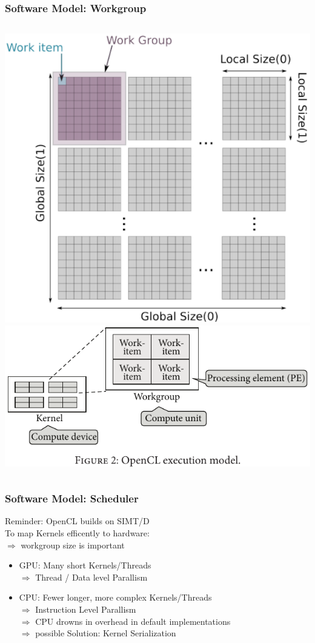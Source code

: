\documentclass{beamer}
\begin{document}
\begin{frame}
    \frametitle{Software Model: Workgroup}
    \begin{columns}
            \includegraphics[width=\textwidth]{res/2DDataParallelWorkgroup.png}  
            \includegraphics[width=\textwidth]{res/ExecutionModel.png}   
    \end{columns}
\end{frame}
\begin{frame}
    \frametitle{Software Model: Scheduler}
    Reminder: OpenCL builds on SIMT/D\\
    To map Kernels efficently to hardware:\\
    $\Rightarrow$ workgroup size is important
    \begin{itemize}
        \item GPU: Many short Kernels/Threads\\
             $\Rightarrow$ Thread / Data level Parallism
        \item CPU: Fewer longer, more complex Kernels/Threads\\
             $\Rightarrow$ Instruction Level Parallism\\
             $\Rightarrow$ CPU drowns in overhead in default implementations\\
             $\Rightarrow$ possible Solution: Kernel Serialization
    \end{itemize}
\end{frame}
\end{document}
